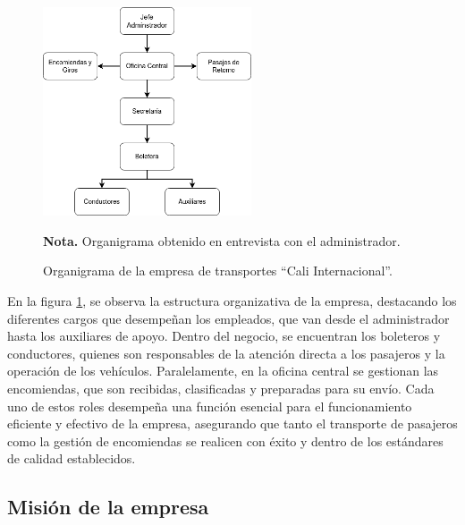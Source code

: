 	\begin{figure}[h] %
		\caption[Organigrama empresa]
		{\newline Organigrama de la empresa de transportes ``Cali Internacional''.} %
		\centering
		\includegraphics[width=0.55\textwidth]{imagenes/figura1_1.png} %
		
		\begin{flushleft}
			\hspace{1.20cm} \textbf{Nota.} Organigrama obtenido en entrevista con el administrador. %
		\end{flushleft}
		\vspace{-16pt}
		\label{fig:figura1_1} %
	\end{figure}
	
	En la figura \ref{fig:figura1_1}, se observa la estructura organizativa de la empresa, destacando los diferentes cargos que desempeñan los empleados, que van desde el administrador hasta los auxiliares de apoyo. Dentro del negocio, se encuentran los boleteros y conductores, quienes son responsables de la atención directa a los pasajeros y la operación de los vehículos. Paralelamente, en la oficina central se gestionan las encomiendas, que son recibidas, clasificadas y preparadas para su envío. Cada uno de estos roles desempeña una función esencial para el funcionamiento eficiente y efectivo de la empresa, asegurando que tanto el transporte de pasajeros como la gestión de encomiendas se realicen con éxito y dentro de los estándares de calidad establecidos.
	
	\subsection*{Misión de la empresa}
	
